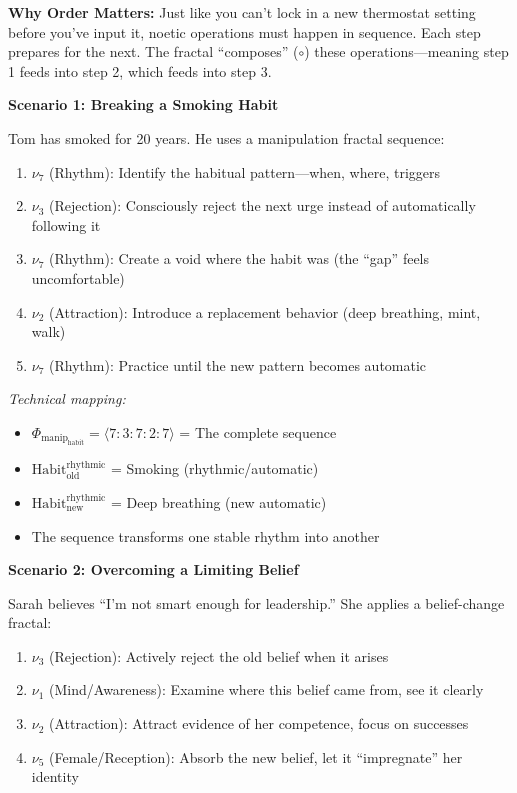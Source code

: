 \documentclass[11pt,twoside]{book}
\newcommand{\noe}[1]{\nu_{#1}}
\newcommand{\ManipFrac}{\Phi_{\mathrm{manip}}}
\begin{document}
\begin{tcolorbox}[colback=green!5!white,colframe=green!65!black,title=\textbf{Plain English: What is a Manipulation Fractal?},breakable]
\textbf{Why Order Matters:}
Just like you can't lock in a new thermostat setting before you've input it, noetic operations must happen in sequence. Each step prepares for the next. The fractal ``composes'' ($\circ$) these operations---meaning step 1 feeds into step 2, which feeds into step 3.

\end{tcolorbox}

\begin{tcolorbox}[colback=yellow!5!white,colframe=yellow!65!black,title=\textbf{Real-Life Scenarios: Manipulation Fractals},breakable]

\textbf{Scenario 1: Breaking a Smoking Habit}

Tom has smoked for 20 years. He uses a manipulation fractal sequence:
\begin{enumerate}
    \item $\noe{7}$ (Rhythm): Identify the habitual pattern---when, where, triggers
    \item $\noe{3}$ (Rejection): Consciously reject the next urge instead of automatically following it
    \item $\noe{7}$ (Rhythm): Create a void where the habit was (the ``gap'' feels uncomfortable)
    \item $\noe{2}$ (Attraction): Introduce a replacement behavior (deep breathing, mint, walk)
    \item $\noe{7}$ (Rhythm): Practice until the new pattern becomes automatic
\end{enumerate}

\textit{Technical mapping:}
\begin{itemize}
    \item $\ManipFrac_{\mathrm{habit}} = \langle 7:3:7:2:7 \rangle$ = The complete sequence
    \item $\mathrm{Habit}_{\mathrm{old}}^{\mathrm{rhythmic}}$ = Smoking (rhythmic/automatic)
    \item $\mathrm{Habit}_{\mathrm{new}}^{\mathrm{rhythmic}}$ = Deep breathing (new automatic)
    \item The sequence transforms one stable rhythm into another
\end{itemize}

\textbf{Scenario 2: Overcoming a Limiting Belief}

Sarah believes ``I'm not smart enough for leadership.'' She applies a belief-change fractal:
\begin{enumerate}
    \item $\noe{3}$ (Rejection): Actively reject the old belief when it arises
    \item $\noe{1}$ (Mind/Awareness): Examine where this belief came from, see it clearly
    \item $\noe{2}$ (Attraction): Attract evidence of her competence, focus on successes
    \item $\noe{5}$ (Female/Reception): Absorb the new belief, let it ``impregnate'' her identity
\end{enumerate}


\end{tcolorbox}
\end{document}

